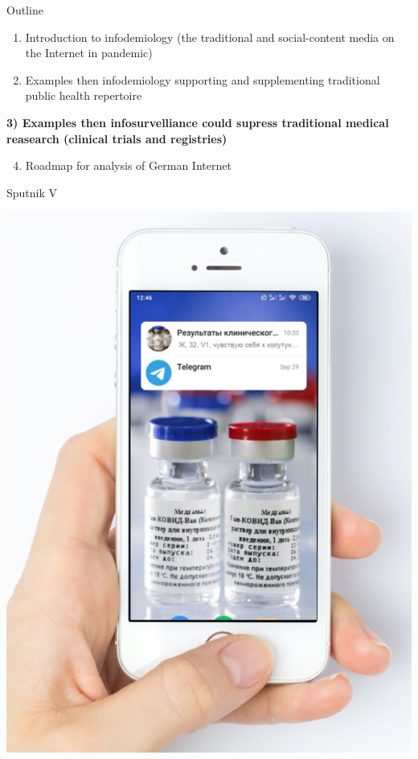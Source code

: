 \documentclass[
  10pt,
  ignorenonframetext,
  a4paper,handout]{beamer}
\providecommand{\tightlist}{%
  \setlength{\itemsep}{0pt}\setlength{\parskip}{0pt}}
\begin{document}
\begin{frame}{Outline}
\protect\hypertarget{outline-2}{}
\Large
\pause

\begin{enumerate}
[1)]
\item
  Introduction to infodemiology (the traditional and social-content
  media on the Internet in pandemic)
\item
  Examples then infodemiology supporting and supplementing traditional
  public health repertoire
\end{enumerate}

\textbf{3) Examples then infosurvelliance could supress traditional
medical reasearch (clinical trials and registries) }

\begin{enumerate}
[1)]
\setcounter{enumi}{3}
\tightlist
\item
  Roadmap for analysis of German Internet
\end{enumerate}

\large

\pause
\end{frame}

\begin{frame}{Sputnik V}
\protect\hypertarget{sputnik-v}{}
\begin{center}\includegraphics[width=0.7\linewidth]{Picture4to3} \end{center}
\end{frame}
\end{document}

